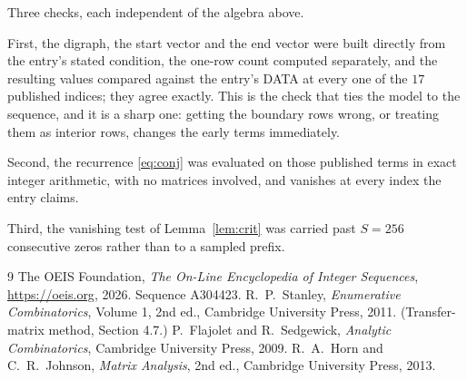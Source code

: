 \documentclass[11pt,a4paper]{article}
\theoremstyle{plain}
\theoremstyle{definition}
\begin{document}
Three checks, each independent of the algebra above.

First, the digraph, the start vector and the end vector were built directly from the
entry's stated condition, the one-row count computed separately, and the resulting values
compared against the entry's DATA at every one of the $17$ published indices; they
agree exactly. This is the check that ties the model to the sequence, and it is a sharp one:
getting the boundary rows wrong, or treating them as interior rows, changes the early terms
immediately.

Second, the recurrence \eqref{eq:conj} was evaluated on those published terms in exact
integer arithmetic, with no matrices involved, and vanishes at every index the entry claims.

Third, the vanishing test of Lemma~\ref{lem:crit} was carried past $S=256$ consecutive
zeros rather than to a sampled prefix.

\begin{thebibliography}{9}
 The OEIS Foundation, \emph{The On-Line Encyclopedia of Integer
Sequences}, \url{https://oeis.org}, 2026. Sequence A304423.
 R.~P.~Stanley, \emph{Enumerative Combinatorics}, Volume 1, 2nd ed.,
Cambridge University Press, 2011. (Transfer-matrix method, Section 4.7.)
 P.~Flajolet and R.~Sedgewick, \emph{Analytic Combinatorics}, Cambridge
University Press, 2009.
 R.~A.~Horn and C.~R.~Johnson, \emph{Matrix Analysis}, 2nd ed., Cambridge
University Press, 2013.
\end{thebibliography}
\end{document}
